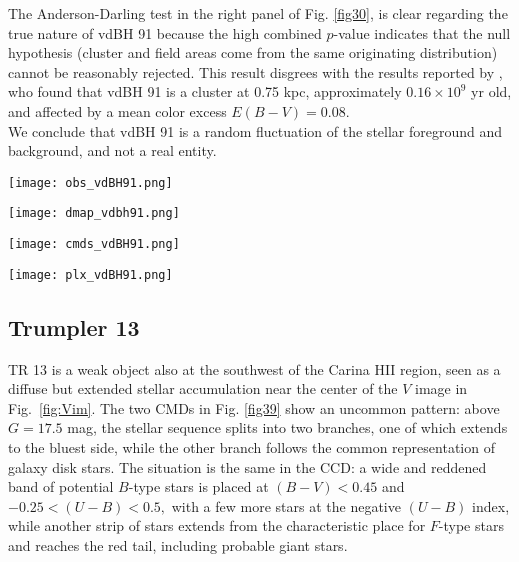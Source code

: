 \documentclass[draft]{aa}
\begin{document}
The Anderson-Darling test in the right panel of Fig. \ref{fig30}, is clear regarding
the true nature of vdBH 91 because the high combined $p$-value
indicates that the null hypothesis (cluster and field areas come from the same
originating distribution) cannot be reasonably rejected. This result disgrees with the results
reported by \cite{Kharchenko_2005}, who found that vdBH 91
is a cluster at 0.75 kpc, approximately $0.16\times10^9$ yr old, and affected by
a mean color excess $E(B-V)=0.08$.\\

We conclude that vdBH 91 is a random fluctuation of the stellar
foreground and background, and not a real entity.

\begin{figure*}[ht]
    \centering
    \texttt{[image: obs\_vdBH91.png]}
    \caption{Idem Fig. \ref{fig:photom_vdBH85} for vdBH 91.}
    \label{fig27}
\end{figure*}
\begin{figure*}[ht]
    \centering
    \texttt{[image: dmap\_vdbh91.png]}
    \caption{Idem Fig. \ref{fig:struct_vdBH85} for vdBH 91.}
    \label{fig28}
\end{figure*}
\begin{figure*}[ht]
    \centering
    \texttt{[image: cmds\_vdBH91.png]}
    \caption{Idem Fig. \ref{fig:fundpars_vdBH85} for vdBH 91.}
    \label{fig29}
\end{figure*}
\begin{figure*}[ht]
    \centering
    \texttt{[image: plx\_vdBH91.png]}
    \caption{Idem Fig. \ref{fig:plx_bys_vdBH85} for vdBH 91.}
    \label{fig30}
\end{figure*}



\subsection{Trumpler 13}

TR 13 is a weak object also at the southwest of the Carina HII
region, seen as a diffuse but extended stellar accumulation near the center of the
$V$ image in Fig.~\ref{fig:Vim}. The two CMDs in Fig. \ref{fig39} show an
uncommon pattern:  above $G=17.5$ mag, the stellar sequence splits
into two branches, one of which extends to the bluest side, while the other
branch follows the common representation of galaxy disk stars. The situation is the same in the CCD: a wide and reddened band of potential
$B$-type stars is placed at $(B-V)<0.45$ and $-0.25<(U-B)<0.5,$ with a few
more stars at  the negative $(U-B)$ index, while another strip of stars extends from the
characteristic place for $F$-type stars and reaches the red tail, including
probable giant stars.\\
\end{document}
